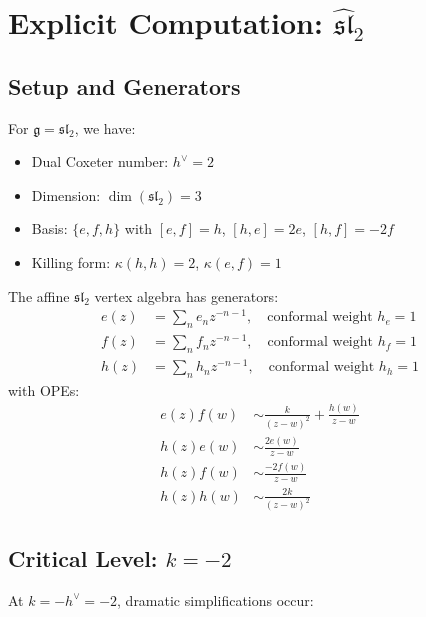 \section{Explicit Computation: $\widehat{\mathfrak{sl}}_2$}

\subsection{Setup and Generators}

For $\mathfrak{g} = \mathfrak{sl}_2$, we have:
\begin{itemize}
\item Dual Coxeter number: $h^\vee = 2$
\item Dimension: $\dim(\mathfrak{sl}_2) = 3$
\item Basis: $\{e, f, h\}$ with $[e,f] = h$, $[h,e] = 2e$, $[h,f] = -2f$
\item Killing form: $\kappa(h,h) = 2$, $\kappa(e,f) = 1$
\end{itemize}

\begin{definition}
The affine $\mathfrak{sl}_2$ vertex algebra has generators:
\begin{align}
e(z) &= \sum_n e_n z^{-n-1}, \quad \text{conformal weight } h_e = 1 \\
f(z) &= \sum_n f_n z^{-n-1}, \quad \text{conformal weight } h_f = 1 \\
h(z) &= \sum_n h_n z^{-n-1}, \quad \text{conformal weight } h_h = 1
\end{align}
with OPEs:
\begin{align}
e(z) f(w) &\sim \frac{k}{(z-w)^2} + \frac{h(w)}{z-w} \\
h(z) e(w) &\sim \frac{2e(w)}{z-w} \\
h(z) f(w) &\sim \frac{-2f(w)}{z-w} \\
h(z) h(w) &\sim \frac{2k}{(z-w)^2}
\end{align}
\end{definition}

\subsection{Critical Level: $k = -2$}

At $k = -h^\vee = -2$, dramatic simplifications occur:

